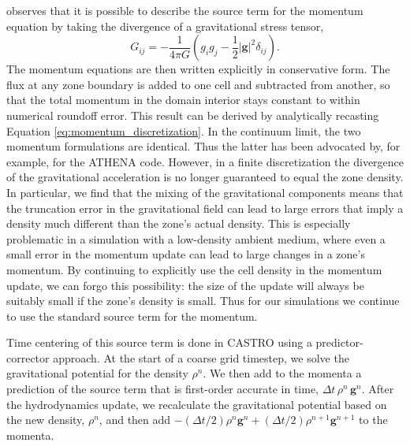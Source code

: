 \documentclass{emulateapj}
\begin{document}
\citet[Chapter 4]{shu:1992} observes that it is possible to describe the source term 
for the momentum equation by taking the divergence of a gravitational stress tensor,
\begin{equation}
  G_{ij} = -\frac{1}{4\pi G}\left(g_i g_j - \frac{1}{2}|\mathbf{g}|^2\delta_{ij}\right).
\end{equation}
The momentum equations are then written explicitly in conservative form.
The flux at any zone boundary is added to one cell and
subtracted from another, so that the total momentum in the domain interior stays constant to
within numerical roundoff error. This result can be derived by analytically recasting 
Equation \ref{eq:momentum_discretization}. In the continuum limit, the two momentum
formulations are identical. Thus the latter has been advocated by, for example, 
\cite{jiang:2013} for the ATHENA code. However, in a finite discretization 
the divergence of the gravitational acceleration is no longer guaranteed to equal
the zone density. In particular, we find that the mixing of the gravitational components
means that the truncation error in the gravitational field can lead to large errors
that imply a density much different than the zone's actual density. This is especially
problematic in a simulation with a low-density ambient medium, where even a small error 
in the momentum update can lead to large changes in a zone's momentum. By continuing to explicitly
use the cell density in the momentum update, we can forgo this possibility: the size of the update
will always be suitably small if the zone's density is small. Thus for our simulations
we continue to use the standard source term for the momentum.

Time centering of this source term is done in CASTRO using a predictor-corrector approach.
At the start of a coarse grid timestep, we solve the gravitational potential for the density $\rho^n$.
We then add to the momenta a prediction of the source term that is first-order accurate in time, 
$\Delta t\, \rho^n\, \mathbf{g}^n$. After the hydrodynamics update, we recalculate
the gravitational potential based on the new density, $\rho^n$, and then add 
$-(\Delta t/2) \rho^n \mathbf{g}^n + (\Delta t/2) \rho^{n+1} \mathbf{g}^{n+1}$ to the momenta.
\end{document}
